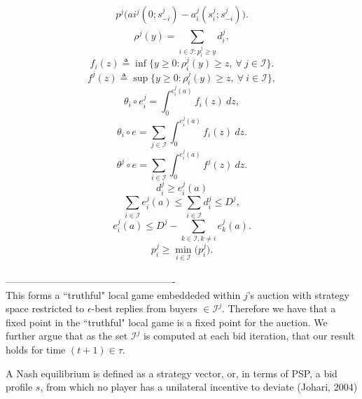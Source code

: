 \documentclass[12pt]{article}
\theoremstyle{definition}
\newcommand{\mcI}{\mathcal{I}}
\begin{document}
\begin{multicols}{2}
\begin{align}
\begin{split}
p^j \bigg(ai^j(0; s_{-i}^j)
    -a_i^j(s_i^j;s_{-i}^j)\bigg).
\end{split}
\end{align}
\begin{equation}
    \rho^j(y) = \sum_{i\in\mcI : p_i^j\ge y} d_i^j, 
\end{equation}
\begin{equation}
    f_i(z) \triangleq \inf\big\lbrace y\ge 0:
        \rho_i^j(y) \ge z, \ \forall \ j \in \mcI\big\rbrace.
\end{equation}
\begin{equation}
    f^j(z) \triangleq \sup\big\lbrace y\ge 0:
        \rho_i^j(y) \ge z, \ \forall \ i \in \mcI\big\rbrace,
\end{equation}
\begin{equation}
    \theta_i \circ e_i^j = \int_0^{e_i^j(a)} f_i(z) \ dz,
\end{equation}
\begin{equation}
    \theta_i \circ e = \displaystyle\sum_{j\in\mcI}
 \int_0^{e_i^j(a)} f_i(z) \ dz.
\end{equation}
\begin{equation}
    \theta^j \circ e = \displaystyle\sum_{i\in\mcI}
 \int_0^{e_i^j(a)} f^j(z) \ dz.
\end{equation}
\begin{equation}
    d_i^j \ge e_i^j(a)
\end{equation}
\begin{equation}
    \displaystyle\sum_{i\in\mcI} e_i^j(a) \le \sum_{i\in\mcI} d^j_i \le D^j,
\end{equation}
\begin{equation}
    e_i^j(a) \le D^j - \sum_{k\in\mcI, k\ne i} e_k^j(a).
\end{equation}
\begin{equation}
   p_i^j \ge \min_{i\in\mcI}\big(p_i^j).
\end{equation}
\\----------------------------------------------------\\
This forms a ``truthful" local game embeddeded within $j$'s auction with strategy space
restricted to $\epsilon$-best replies from buyers $\in \mcI^j$. Therefore we have that a
fixed point in the ``truthful" local game is a fixed point for the auction. We
further argue that as the set $\mcI^j$ is
computed at each bid iteration, that our result holds for time $(t+1) \in \tau$.

A Nash equilibrium is defined as a strategy vector, or, in terms of PSP, a bid
profile $s$,
from which no player has a unilateral incentive to deviate (Johari, 2004)



\end{multicols}
\end{document}
